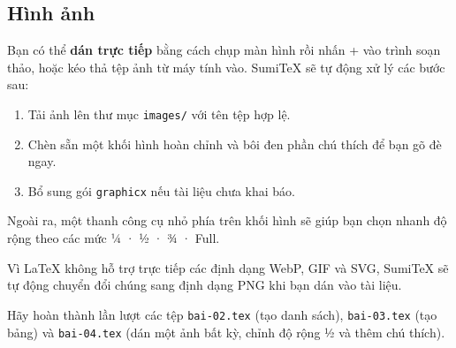 \subsection{Hình ảnh}
Bạn có thể \textbf{dán trực tiếp} bằng cách chụp màn hình rồi nhấn
+ vào trình soạn thảo, hoặc kéo thả tệp ảnh từ máy tính vào.
SumiTeX sẽ tự động xử lý các bước sau:
\begin{enumerate}
  \item Tải ảnh lên thư mục \texttt{images/} với tên tệp hợp lệ.
  \item Chèn sẵn một khối hình hoàn chỉnh và bôi đen phần chú thích để bạn gõ
    đè ngay.
  \item Bổ sung gói \texttt{graphicx} nếu tài liệu chưa khai báo.
\end{enumerate}
Ngoài ra, một thanh công cụ nhỏ phía trên khối hình sẽ giúp bạn chọn nhanh độ
rộng theo các mức ¼ · ½ · ¾ · Full.

\begin{chuy}
Vì \LaTeX{} không hỗ trợ trực tiếp các định dạng WebP, GIF và SVG, SumiTeX sẽ
tự động chuyển đổi chúng sang định dạng PNG khi bạn dán vào tài liệu.
\end{chuy}

\begin{thuchanh}[Bài 2, 3, 4]
Hãy hoàn thành lần lượt các tệp \texttt{bai-02.tex} (tạo danh sách),
\texttt{bai-03.tex} (tạo bảng) và \texttt{bai-04.tex} (dán một ảnh bất kỳ,
chỉnh độ rộng ½ và thêm chú thích).
\end{thuchanh}
